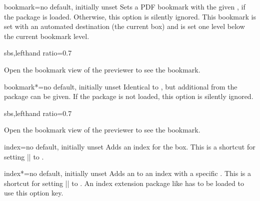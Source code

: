 \begin{docTcbKey}[][doc new=2017-02-10]{bookmark}{=}{no default, initially unset}
  Sets a PDF bookmark with the given , if the package  \cite{oberdiek:bookmark}
  is loaded. Otherwise, this option is silently ignored.
  This bookmark is set with an automated destination (the current box)
  and is set one level below the current bookmark level.
  \begin{dispExample*}{sbs,lefthand ratio=0.7}
\begin{tcolorbox}[colback=blue!10,colframe=blue!50!black,
  bookmark=Example for using a bookmark,
  title=Example for using a bookmark]
Open the bookmark view of the previewer
to see the bookmark.
\end{tcolorbox}
  \end{dispExample*}
\end{docTcbKey}


\begin{docTcbKey}[][doc new=2017-02-10]{bookmark*}{=}{no default, initially unset}
  Identical to , but additional 
  from the package  \cite{oberdiek:bookmark} can be given.
  If the package  \cite{oberdiek:bookmark} is not loaded,
  this option is silently ignored.
  \begin{dispExample*}{sbs,lefthand ratio=0.7}
\begin{tcolorbox}[colback=red!10,colframe=red!50!black,
  bookmark*={color=red,italic,bold}%
            {Another bookmark example},
  title=Red and bold bookmark]
Open the bookmark view of the previewer
to see the bookmark.
\end{tcolorbox}
  \end{dispExample*}
\end{docTcbKey}



\begin{docTcbKey}[][doc new=2018-07-26]{index}{=}{no default, initially unset}
  Adds an index  for the box. This is a shortcut for
  setting |\index| to .
\end{docTcbKey}


\begin{docTcbKey}[][doc new=2018-07-26]{index*}{=}{no default, initially unset}
  Adds an  to an index with a specific .
  This is a shortcut for
  setting |\index| to .
  An index extension package like  has to be loaded to use
  this option key.
\end{docTcbKey}









